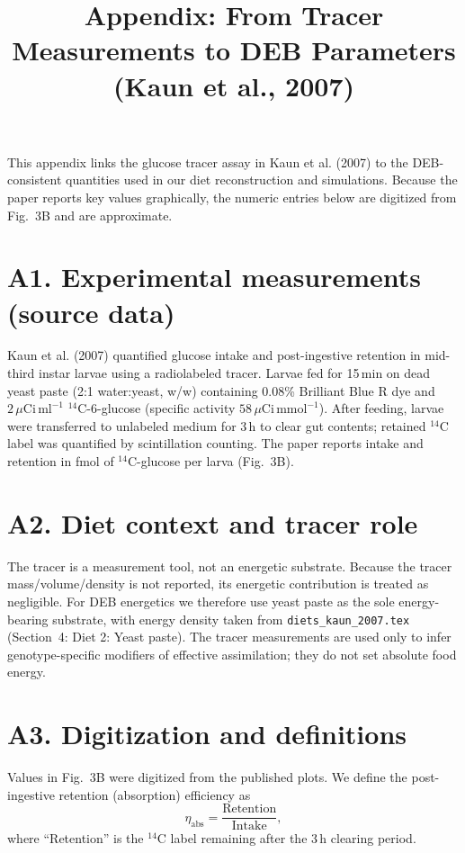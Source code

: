 \documentclass[11pt]{article}
\title{Appendix: From Tracer Measurements to DEB Parameters\\(Kaun et al., 2007)}
\author{}
\date{}
\begin{document}
\maketitle

This appendix links the glucose tracer assay in Kaun et al. (2007) to the DEB-consistent quantities used in our diet reconstruction and simulations. Because the paper reports key values graphically, the numeric entries below are digitized from Fig.~3B and are approximate.

\section*{A1. Experimental measurements (source data)}
Kaun et al. (2007) quantified glucose intake and post-ingestive retention in mid-third instar larvae using a radiolabeled tracer. Larvae fed for 15\,min on dead yeast paste (2:1 water:yeast, w/w) containing 0.08\% Brilliant Blue R dye and $2\,\mu\mathrm{Ci\,ml^{-1}}$ $^{14}$C-6-glucose (specific activity $58\,\mu\mathrm{Ci\,mmol^{-1}}$). After feeding, larvae were transferred to unlabeled medium for 3\,h to clear gut contents; retained $^{14}$C label was quantified by scintillation counting. The paper reports intake and retention in fmol of $^{14}$C-glucose per larva (Fig.~3B).

\section*{A2. Diet context and tracer role}
The tracer is a measurement tool, not an energetic substrate. Because the tracer mass/volume/density is not reported, its energetic contribution is treated as negligible. For DEB energetics we therefore use yeast paste as the sole energy-bearing substrate, with energy density taken from \texttt{diets\_kaun\_2007.tex} (Section~4: Diet 2: Yeast paste). The tracer measurements are used only to infer genotype-specific modifiers of effective assimilation; they do not set absolute food energy.

\section*{A3. Digitization and definitions}
Values in Fig.~3B were digitized from the published plots. We define the post-ingestive retention (absorption) efficiency as
\begin{equation}
  \eta_{\mathrm{abs}} = \frac{\text{Retention}}{\text{Intake}},
\end{equation}
where ``Retention'' is the $^{14}$C label remaining after the 3\,h clearing period.
\end{document}
